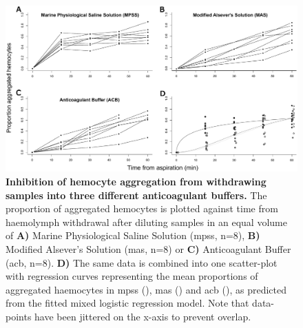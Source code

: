 \begin{figure}[!ht]
    \centering
    \includegraphics[width=1.0\textwidth]{figures/Method development/Propagg x4 plot.pdf}
    \caption{\textbf{Inhibition of hemocyte aggregation from withdrawing samples into three different anticoagulant buffers.} The proportion of aggregated hemocytes is plotted against time from haemolymph withdrawal after diluting samples in an equal volume of \textbf{A)} Marine Physiological Saline Solution (\acrshort{mpss}, n=8), \textbf{B)} Modified Alsever's Solution (\acrshort{mas}, n=8) or \textbf{C)} Anticoagulant Buffer (\acrshort{acb}, n=8).  \textbf{D)} The same data is combined into one scatter-plot with regression curves representing the mean proportions of aggregated haemocytes in \acrshort{mpss} (\protect\darkgraycircle), \acrshort{mas} (\protect\lysegraacircle) and \acrshort{acb} (\protect\graycircle), as predicted from the fitted mixed logistic regression model. Note that data-points have been jittered on the x-axis to prevent overlap.}
    \label{fig:aggregation}
\end{figure}

